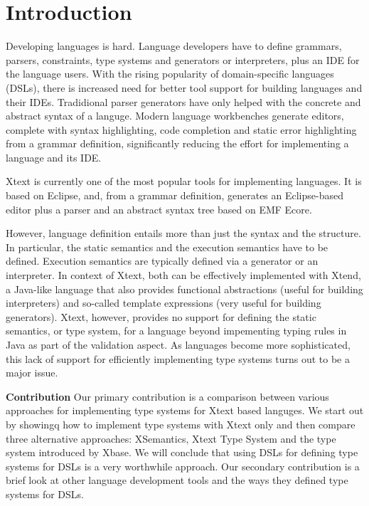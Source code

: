 \section{Introduction}
\label{sec:introduction}
 
Developing languages is hard. Language developers have to define grammars,
parsers, constraints, type systems and generators or interpreters, plus an IDE
for the language users. With the rising popularity of domain-specific languages
(DSLs), there is increased need for better tool support for building languages
and their IDEs. Tradidional parser generators have only helped with the concrete
and abstract syntax of a languge. Modern language workbenches generate editors,
complete with syntax highlighting, code completion and static error highlighting
from a grammar definition, significantly reducing the effort for implementing a
language and its IDE. 

Xtext is currently one of the most popular tools for implementing languages. It
is based on Eclipse, and, from a grammar definition, generates an Eclipse-based
editor plus a parser and an abstract syntax tree based on EMF Ecore. 

However, language definition entails more than just the syntax and the
structure. In particular, the static semantics and the execution semantics have
to be defined. Execution semantics are typically defined via a generator or an
interpreter. In context of Xtext, both can be effectively implemented with
Xtend, a Java-like language that also provides functional abstractions (useful
for building interpreters) and so-called template expressions (very useful for
building generators). Xtext, however, provides no support for defining the
static semantics, or type system, for a language beyond impementing typing rules
in Java as part of the validation aspect. As languages become more
sophisticated, this lack of support for efficiently implementing type systems
turns out to be a major issue.


\textbf{Contribution} Our primary contribution is a comparison between various
approaches for implementing type systems for Xtext based languges. We start out
by showingq how to implement type systems with Xtext only and then compare three
alternative approaches: XSemantics, Xtext Type System and the type system introduced 
by Xbase. We will conclude that using DSLs for defining type systems for DSLs is
a very worthwhile approach. Our secondary contribution is a brief look
at other language development tools and the ways they defined type systems for
DSLs.


